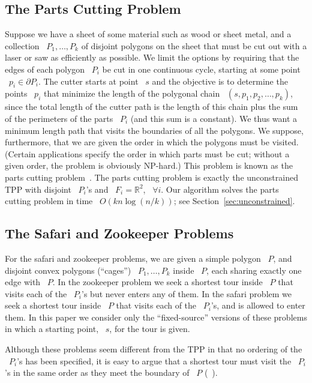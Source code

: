 \documentclass[11pt]{article}
\begin{document}
\subsection{The Parts Cutting Problem}

Suppose we have a sheet of some material such as wood or sheet metal, and a collection ~\(P_1, \ldots, P_k\) of disjoint polygons on the sheet that must be cut out with a laser or saw as efficiently as possible.
We limit the options by requiring that the edges of each polygon ~\(P_i\) be cut in one continuous cycle, starting at some point ~\(p_i \in \partial P_i\).
The cutter starts at point ~\(s\) and the objective is to determine the points ~\(p_i\) that minimize the length of the polygonal chain ~\((s, p_1, p_2, \ldots, p_k)\), since the total length of the cutter path is the length of this chain plus the sum of the perimeters of the parts ~\(P_i\) (and this sum is a constant).
We thus want a minimum length path that visits the boundaries of all the polygons.
We suppose, furthermore, that we are given the order in which the polygons must be visited.
(Certain applications specify the order in which parts must be cut; without a given order, the problem is obviously NP-hard.)
This problem is known as the parts cutting problem~\cite{ref16}.
The parts cutting problem is exactly the unconstrained TPP with disjoint ~\(P_i\)'s and ~\(F_i = \mathbb{R}^2\), ~\(\forall i\).
Our algorithm solves the parts cutting problem in time ~\(O(kn\log(n/k))\); see Section~\ref{sec:unconstrained}.

\subsection{The Safari and Zookeeper Problems}

For the safari and zookeeper problems, we are given a simple polygon ~\(P\), and disjoint convex polygons (``cages'') ~\(P_1, \ldots, P_k\) inside ~\(P\), each sharing exactly one edge with ~\(P\).
In the zookeeper problem we seek a shortest tour inside ~\(P\) that visits each of the ~\(P_i\)'s but never enters any of them.
In the safari problem we seek a shortest tour inside ~\(P\) that visits each of the ~\(P_i\)'s, and is allowed to enter them.
In this paper we consider only the ``fixed-source'' versions of these problems in which a starting point, ~\(s\), for the tour is given.

Although these problems seem different from the TPP in that no ordering of the ~\(P_i\)'s has been specified, it is easy to argue that a shortest tour must visit the ~\(P_i\)'s in the same order as they meet the boundary of ~\(P\) (~\cite{ref8, ref21}).
\end{document}
